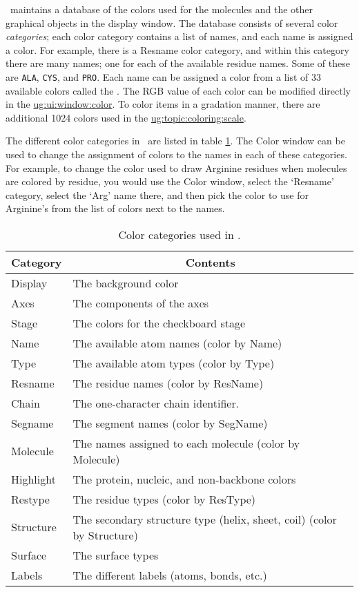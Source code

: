 \VMD\ maintains a database of the colors used for the molecules and the
other graphical objects in the display window.  The database consists
of several color {\em categories}; each color
category contains a list of names, and each name is assigned a color.
For example, there is a Resname color category, and within this
category there are many names; one for each of the available residue
names.  Some of these are {\tt ALA}, {\tt CYS}, and {\tt PRO}.  Each
name can be assigned a color from a list of 33 available colors called
the .  The RGB value of each color can
be modified directly in the
\hyperref{{\sf Color} window}{{\sf Color} window [\S}{]}{ug:ui:window:color}.
To color items in a gradation manner,
there are additional 1024 colors used in the
\hyperref{color scale}{color scale [\S}{]}{ug:topic:coloring:scale}.

The different color categories in \VMD\ are listed in table
\ref{table:ug:colorcats}.  The {\sf Color} window
can be used to change the assignment
of colors to the names in each of these categories.  For example, to
change the color used to draw Arginine residues when molecules are
colored by residue, you would use the {\sf Color} window, select the `Resname'
category, select the `Arg' name there, and then pick the color to use
for Arginine's from the list of colors next to the names.

\begin{table}[htb]
  \hspace{0.8in}
  \begin{tabular}{|l|l|} \hline
    \multicolumn{1}{|c}{Category} &
        \multicolumn{1}{|c|}{Contents} \\ \hline\hline
    Display	& The background color \\
    Axes	& The components of the axes \\
    Stage	& The colors for the checkboard stage \\
    Name	& The available atom names (color by Name) \\
    Type	& The available atom types (color by Type) \\
    Resname	& The residue names (color by ResName) \\
    Chain	& The one-character chain identifier. \\
    Segname	& The segment names (color by SegName)  \\
    Molecule	& The names assigned to each molecule (color by Molecule) \\
    Highlight	& The protein, nucleic, and non-backbone colors \\
    Restype	& The residue types (color by ResType) \\
    Structure & The secondary structure type (helix, sheet, coil) (color by Structure) \\
    Surface & The surface types \\
    Labels	& The different labels (atoms, bonds, etc.) \\ \hline
  \end{tabular}
  \caption{Color categories used in \VMD.}
  \label{table:ug:colorcats}
\end{table}


